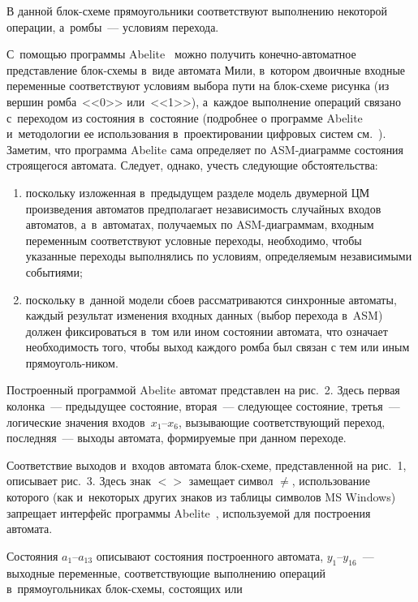 \begin{multicols}{2}
     В данной блок-схе\-ме прямоугольники соответствуют выполнению 
некоторой операции, а~ромбы~--- условиям перехода. 

С~помощью программы 
Abelite~\cite{8-fr} можно получить ко\-неч\-но-ав\-то\-мат\-ное представление  
блок-схе\-мы в~виде автомата Мили, в~котором двоичные входные переменные 
соответствуют условиям выбора пути на блок-схе\-ме рисунка (из вершин 
ромба~<<0>> или~<<1>>), а~каждое выполнение операций связано 
с~переходом из состояния в~состояние (подробнее о программе Abelite 
и~методологии ее использования в~проектировании цифровых систем 
см.~\cite{7-fr, 8-fr}). Заметим, что программа Abelite сама определяет по  
ASM-диа\-грам\-ме состояния строящегося автомата. Следует, однако, учесть 
следующие обстоятельства:
     \begin{enumerate}[(1)]
\item поскольку изложенная в~предыдущем разделе модель двумерной 
ЦМ произведения автоматов предполагает независимость случайных 
входов автоматов, а~в~автоматах, получаемых по ASM-диа\-грам\-мам, 
входным переменным соответствуют условные переходы, необходимо, 
чтобы указанные переходы выполнялись по условиям, определяемым 
независимыми событиями;
\item поскольку в~данной модели сбоев рассматриваются синхронные 
автоматы, каждый результат изменения входных данных (выбор перехода 
в~ASM) должен фиксироваться в~том или ином состоянии автомата, что 
означает необходимость того, чтобы выход каждого ромба был связан с тем 
или иным прямоуголь-\linebreak ником.
\end{enumerate}

          

     Построенный программой Abelite автомат представлен на рис.~2.
Здесь первая колонка~--- предыду\-щее состояние, вторая~--- следующее 
состояние, третья~--- логические значения входов~$x_1$--$x_6$, вызывающие 
соответствующий переход, последняя~--- выходы автомата, формируемые при 
данном переходе. 

Соответствие выходов и~входов автомата блок-схе\-ме, 
пред\-став\-лен\-ной на рис.~1, описывает рис.~3. 
%  
     Здесь знак $<>$ замещает символ $\not=$, использование которого (как 
и~некоторых других знаков из таблицы символов MS Windows) запрещает 
интерфейс программы Abelite~\cite{8-fr}, используемой для по\-стро\-ения 
автомата.
     
     Состояния $a_1$--$a_{13}$ описывают состояния построенного автомата,  
$y_1$--$y_{16}$~--- выходные переменные, соответствующие 
выполнению операций в~прямоугольниках блок-схе\-мы, состоящих
или\linebreak\vspace*{-12pt}


\end{multicols}
